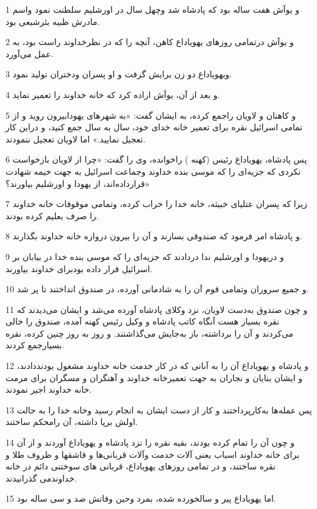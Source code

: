 \par 1 و یوآش هفت ساله بود که پادشاه شد وچهل سال در اورشلیم سلطنت نمود واسم مادرش ظبیه بئرشبعی بود.
\par 2 و یوآش درتمامی روزهای یهویاداع کاهن، آنچه را که در نظرخداوند راست بود، به عمل می‌آورد.
\par 3 ویهویاداع دو زن برایش گرفت و او پسران ودختران تولید نمود.
\par 4 و بعد از آن، یوآش اراده کرد که خانه خداوند را تعمیر نماید.
\par 5 و کاهنان و لاویان راجمع کرده، به ایشان گفت: «به شهرهای یهودابیرون روید و از تمامی اسرائیل نقره برای تعمیر خانه خدای خود، سال به سال جمع کنید، و دراین کار تعجیل نمایید.» اما لاویان تعجیل ننمودند.
\par 6 پس پادشاه، یهویاداع رئیس (کهنه ) راخوانده، وی را گفت: «چرا از لاویان بازخواست نکردی که جزیه‌ای را که موسی بنده خداوند وجماعت اسرائیل به جهت خیمه شهادت قرارداده‌اند، از یهودا و اورشلیم بیاورند؟»
\par 7 زیرا که پسران عتلیای خبیثه، خانه خدا را خراب کرده، وتمامی موقوفات خانه خداوند را صرف بعلیم کرده بودند.
\par 8 و پادشاه امر فرمود که صندوقی بسازند و آن را بیرون دروازه خانه خداوند بگذارند.
\par 9 و دریهودا و اورشلیم ندا دردادند که جزیه‌ای را که موسی بنده خدا در بیابان بر اسرائیل قرار داده بودبرای خداوند بیاورند.
\par 10 و جمیع سروران وتمامی قوم آن را به شادمانی آورده، در صندوق انداختند تا پر شد.
\par 11 و چون صندوق به‌دست لاویان، نزد وکلای پادشاه آورده می‌شد و ایشان می‌دیدند که نقره بسیار هست آنگاه کاتب پادشاه و وکیل رئیس کهنه آمده، صندوق را خالی می‌کردند و آن را برداشته، باز به‌جایش می‌گذاشتند. و روز به روز چنین کرده، نقره بسیارجمع کردند.
\par 12 و پادشاه و یهویاداع آن را به آنانی که در کار خدمت خانه خداوند مشغول بودنددادند، و ایشان بنایان و نجاران به جهت تعمیرخانه خداوند و آهنگران و مسگران برای مرمت خانه خداوند اجیر نمودند.
\par 13 پس عمله‌ها به‌کارپرداختند و کار از دست ایشان به انجام رسید وخانه خدا را به حالت اولش برپا داشته، آن رامحکم ساختند.
\par 14 و چون آن را تمام کرده بودند، بقیه نقره را نزد پادشاه و یهویاداع آوردند و از آن برای خانه خداوند اسباب یعنی آلات خدمت وآلات قربانی‌ها و قاشقها و ظروف طلا و نقره ساختند، و در تمامی روزهای یهویاداع، قربانی های سوختنی دائم در خانه خداوندمی گذرانیدند.
\par 15 اما یهویاداع پیر و سالخورده شده، بمرد وحین وفاتش صد و سی ساله بود.
